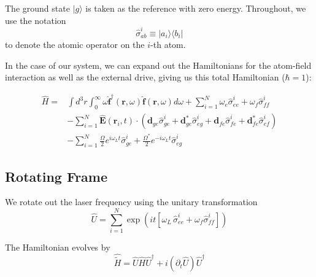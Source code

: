 \documentclass[a4paper, 11pt]{article}
\numberwithin{equation}{section}
\newcommand{\ket}[1]{| #1 \rangle}
\newcommand{\braket}[2]{| #1 \rangle\langle #2 |}
\begin{document}
The ground state $\ket{g}$ is taken as the reference with zero energy. Throughout, we
use the notation $$\hat{\sigma}_{ab}^i \equiv \braket{a_i}{b_i}$$ to denote the atomic
operator on the $i$-th atom.
\vspace{1em}

In the case of our system, we can expand out the Hamiltonians for the atom-field
interaction as well as the external drive, giving us this total Hamiltonian
($\hbar=1$):

\begin{equation}
  \begin{aligned}
    \hat{H} = &\int d^3r \int_0^\infty \omega \hat{\mathbf{f}}^\dagger (\mathbf{r},
    \omega) \hat{\mathbf{f}}(\mathbf{r}, \omega) d\omega + \sum_{i=1}^N \omega_e
    \hat{\sigma}_{ee}^i + \omega_f \hat{\sigma}_{ff}^i\\ &-\sum_{i=1}^N
    \hat{\mathbf{E}}(\mathbf{r}_i, t) \cdot \left( \mathbf{d}_{ge} \hat{\sigma}^i_{ge}
    + \mathbf{d}_{ge}^* \hat{\sigma}^i_{eg} + \mathbf{d}_{fe} \hat{\sigma}^i_{fe} +
    \mathbf{d}_{fe}^* \hat{\sigma}^i_{ef} \right)\\ &-\sum_{i=1}^N \frac{\Omega}{2}
    e^{i\omega_Lt} \hat{\sigma}_{ge}^i + \frac{\Omega^*}{2} e^{-i\omega_Lt}
    \hat{\sigma}_{eg}^i
  \end{aligned}
\end{equation}

\subsection{Rotating Frame}
We rotate out the laser frequency using the unitary transformation 
\begin{equation}
  \hat{U} = \sum_{i=1}^N \exp\left(it\left[\omega_L\,\hat{\sigma}_{ee}^i +
      \omega_f\hat{\sigma}_{ff}^i\right]\right)
\end{equation}


The Hamiltonian evolves by \cite{SteckQAO}
\begin{equation}
  \hat{\tilde{H}} = \hat{U}\hat{H}\hat{U}^\dagger + i(\partial_t \hat{U})\hat{U}^\dagger
\end{equation}
\end{document}
